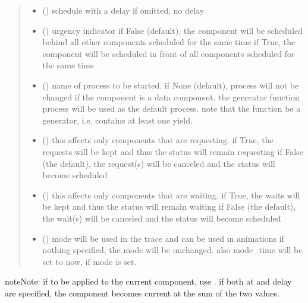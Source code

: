 \documentclass[letterpaper,10pt,english]{sphinxmanual}
\begin{document}
\begin{fulllineitems}
\begin{fulllineitems}
\begin{quote}
\begin{description}
\begin{itemize}
\item {} 
 () \textendash{} schedule with a delay 
if omitted, no delay

\item {} 
 () \textendash{} urgency indicator 
if False (default), the component will be scheduled
behind all other components scheduled
for the same time 
if True, the component will be scheduled
in front of all components scheduled
for the same time

\item {} 
 () \textendash{} name of process to be started. 
if None (default), process will not be changed 
if the component is a data component, the
generator function process will be used as the default process. 
note that the function  be a generator,
i.e. contains at least one yield.

\item {} 
 () \textendash{} this affects only components that are requesting. 
if True, the requests will be kept and thus the status will remain requesting 
if False (the default), the request(s) will be canceled and the status will become scheduled

\item {} 
 () \textendash{} this affects only components that are waiting. 
if True, the waits will be kept and thus the status will remain waiting 
if False (the default), the wait(s) will be canceled and the status will become scheduled

\item {} 
 () \textendash{} mode 
will be used in the trace and can be used in animations 
if nothing specified, the mode will be unchanged. 
also mode\_time will be set to now, if mode is set.

\end{itemize}

\end{description}\end{quote}

\begin{sphinxadmonition}{note}{Note:}
if to be applied to the current component, use . 
if both at and delay are specified, the component becomes current at the sum
of the two values.
\end{sphinxadmonition}


\end{fulllineitems}
\end{fulllineitems}
\end{document}
